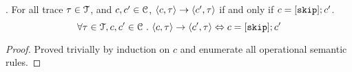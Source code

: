 %
%
\begin{lem}.
	\label{lem:inv_skip}
	For all trace $\mathtt{\tau}\in \mathcal{T}$, and $c, c' \in \mathcal{C}$,  
	$\langle c, \mathtt{\tau} \rangle \rightarrow \langle c', \mathtt{\tau} \rangle$ if and only if $c = [\mathtt{skip}];c'$. 
	\[
		\forall \mathtt{\tau}\in \mathcal{T}, c, c' \in \mathcal{C} ~.~
		\langle c, \mathtt{\tau} \rangle \rightarrow \langle c', \mathtt{\tau} \rangle
		\Leftrightarrow 
		c = [\mathtt{skip}];c'
	\]
	\end{lem}
\begin{proof}
	Proved trivially by induction on $c$ and enumerate all operational semantic rules.
\end{proof}
%
